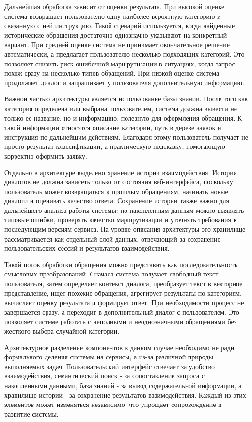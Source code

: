 \documentclass[14pt,a4paper]{extarticle}
\numberwithin{figure}{section}
\numberwithin{table}{section}
\begin{document}
Дальнейшая обработка зависит от оценки результата. При
высокой оценке система возвращает пользователю одну наиболее
вероятную категорию и связанную с ней инструкцию. Такой сценарий
используется, когда найденные исторические обращения достаточно
однозначно указывают на конкретный вариант. При средней оценке
система не принимает окончательное решение автоматически, а предлагает
пользователю несколько подходящих категорий. Это позволяет снизить риск
ошибочной маршрутизации в ситуациях, когда запрос похож сразу на
несколько типов обращений. При низкой оценке система продолжает
диалог и запрашивает у пользователя дополнительную информацию.

Важной частью архитектуры является использование базы знаний. После того
как категория определена или выбрана пользователем, система должна
вывести не только ее название, но и информацию, полезную для оформления
обращения. К такой информации относятся описание категории, путь в
дереве заявок и инструкция по дальнейшим действиям. Благодаря этому
пользователь получает не просто результат классификации, а практическую
подсказку, помогающую корректно оформить заявку.

Отдельно в архитектуре выделено хранение истории взаимодействия. История
диалогов не должна зависеть только от состояния веб-интерфейса,
поскольку пользователь может возвращаться к прошлым обращениям, начинать
новые диалоги и оценивать качество ответа. Сохранение истории также
важно для дальнейшего анализа работы системы: по накопленным данным
можно выявлять типовые ошибки, проверять качество маршрутизации и
уточнять требования к последующим версиям сервиса. На уровне описания
архитектуры это хранилище рассматривается как отдельный слой данных,
отвечающий за сохранение пользовательских сессий и результатов
взаимодействия.

Такой поток обработки обращения можно представить как последовательность
смысловых преобразований. Сначала система получает свободный текст
пользователя, затем определяет контекст диалога, преобразует текст в
векторное представление, ищет похожие обращения, агрегирует результаты
по категориям, вычисляет оценку результата и формирует ответ. При
необходимости процесс не завершается сразу, а переходит в дополнительный
диалог с пользователем. Это позволяет системе работать с неполными и
неоднозначными обращениями без жесткого выбора случайной категории.

Архитектурное разделение компонентов в данном случае необходимо не ради
формального деления системы на сервисы, а из-за различной природы
выполняемых задач. Пользовательский интерфейс отвечает за удобство
взаимодействия, семантический поиск - за сопоставление запроса с
накопленными данными, база знаний - за вывод содержательной информации,
а хранилище истории - за сохранение результатов взаимодействия. Каждый
из этих элементов может изменяться независимо, что упрощает
сопровождение и развитие системы.
\end{document}
